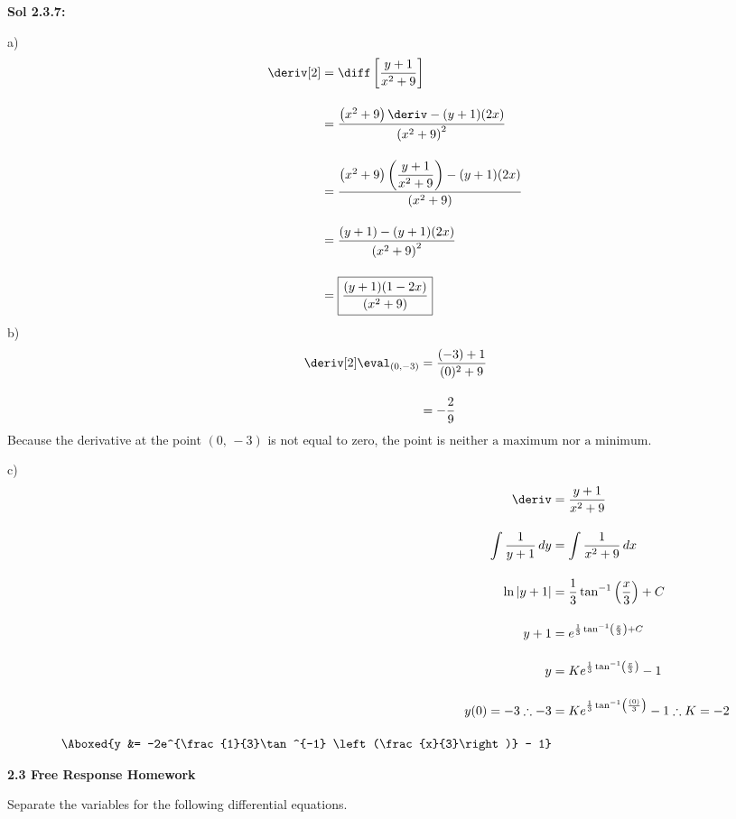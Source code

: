 \begin{tcolorbox}[solution]
    \textbf{Sol 2.3.7: } \par
    a) \begin{align*}
        \deriv[2] &= \diff \left[\dfrac{y + 1}{x^2 + 9}\right] \\[11pt]
        & = \dfrac{\left(x^2 + 9\right)\deriv - (y + 1)(2x)}{\left(x^2 + 9\right)^2} \\[11pt]
        & = \dfrac{\left(x^2 + 9\right)\left(\dfrac{y + 1}{x^2 + 9}\right) - (y + 1)(2x)}{\left(x^2 + 9\right)} \\[11pt]
        & = \dfrac{(y + 1) - (y + 1)(2x)}{\left(x^2 + 9\right)^2} \\[11pt]
        & = \boxed{\dfrac{(y + 1)(1 - 2x)}{\left(x^2 + 9\right)}}
    \end{align*}
    b) \begin{align*}
        \deriv[2] \eval_{(0, -3)} &= \dfrac{(-3) + 1}{(0)^2 + 9} \\[11pt]
        & = -\dfrac{2}{9}
    \end{align*}
    Because the derivative at the point $(0, \, -3)$ is not equal to zero, the point is $\boxed{\text{neither a maximum nor a minimum}}$. \par
    \vspace{11pt}
    c) \begin{align*}
        \deriv &= \dfrac{y + 1}{x^2 + 9} \\[11pt]
        \int \dfrac{1}{y + 1} \, dy &= \int \dfrac{1}{x^2 + 9} \, dx \\[11pt]
        \ln |y + 1| &= \dfrac{1}{3}\tan^{-1} \left(\dfrac{x}{3}\right) + C \\[11pt]
        y + 1 &= e^{\frac{1}{3}\tan^{-1} \left(\frac{x}{3}\right) + C} \\[11pt]
        y &= Ke^{\frac{1}{3}\tan^{-1} \left(\frac{x}{3}\right)} - 1 \\[11pt]
        y(0) = -3 \therefore -3 &= Ke^{\frac{1}{3}\tan^{-1} \left(\frac{(0)}{3}\right)} - 1 \therefore K = -2 \\[11pt]
        \Aboxed{y &= -2e^{\frac{1}{3}\tan^{-1} \left(\frac{x}{3}\right)} - 1}
    \end{align*} 
\end{tcolorbox} 

\newpage

\textbf{\large{2.3 Free Response Homework}} \par

Separate the variables for the following differential equations. \par

